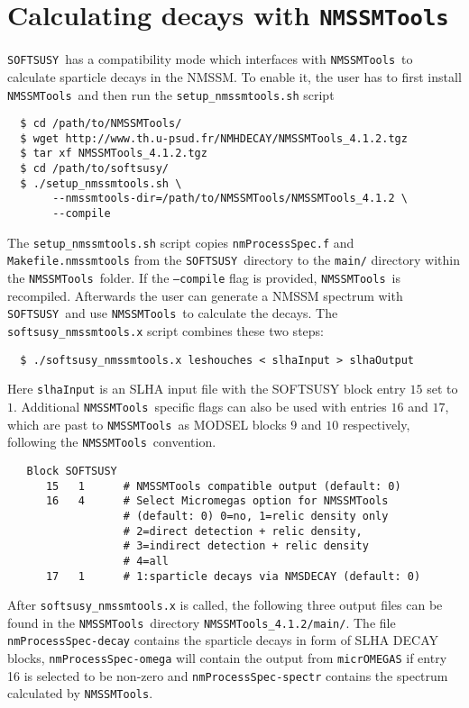 \documentclass[final,3p,times,pdflatex]{elsarticle}
\def\SOFTSUSY{{\tt SOFTSUSY}}
\def\NMSSMTools{{\tt NMSSMTools}}
\def\code#1{\small{\tt #1}\normalsize}
\begin{document}


\section{Calculating decays with \NMSSMTools\label{sec:decays}}

\SOFTSUSY\ has a compatibility mode which interfaces with \NMSSMTools\
to calculate sparticle decays in the NMSSM.  To enable it, the
user has to first install \NMSSMTools\ and then run the
\code{setup\_nmssmtools.sh} script
%
\begin{verbatim}
  $ cd /path/to/NMSSMTools/
  $ wget http://www.th.u-psud.fr/NMHDECAY/NMSSMTools_4.1.2.tgz
  $ tar xf NMSSMTools_4.1.2.tgz
  $ cd /path/to/softsusy/
  $ ./setup_nmssmtools.sh \
       --nmssmtools-dir=/path/to/NMSSMTools/NMSSMTools_4.1.2 \
       --compile
\end{verbatim}
%
The \code{setup\_nmssmtools.sh} script copies \code{nmProcessSpec.f}
and \code{Makefile.nmssmtools} from the \SOFTSUSY\ directory to the
{\tt main/} directory within the \NMSSMTools\ folder.  If the \code{--compile}
flag is provided, \NMSSMTools\ is recompiled.  Afterwards the user can
generate a NMSSM spectrum with \SOFTSUSY\ and use \NMSSMTools\ to
calculate the decays.  The \code{softsusy\_nmssmtools.x} script combines
these two steps:
%
\begin{verbatim}
  $ ./softsusy_nmssmtools.x leshouches < slhaInput > slhaOutput
\end{verbatim}
%
Here \code{slhaInput} is an SLHA input file with the SOFTSUSY block
entry $15$ set to $1$.  Additional \NMSSMTools\ specific flags can also
be used with entries $16$ and $17$, which are past to \NMSSMTools\ as
MODSEL blocks $9$ and $10$ respectively, following the \NMSSMTools\
convention.
%
\begin{verbatim}
   Block SOFTSUSY
      15   1      # NMSSMTools compatible output (default: 0) 
      16   4      # Select Micromegas option for NMSSMTools
                  # (default: 0) 0=no, 1=relic density only
                  # 2=direct detection + relic density, 
                  # 3=indirect detection + relic density
                  # 4=all  
      17   1      # 1:sparticle decays via NMSDECAY (default: 0)
\end{verbatim}
%
After \code{softsusy\_nmssmtools.x} is called, the following three output
files can be found in the \NMSSMTools\ directory
\code{NMSSMTools\_4.1.2/main/}. The file \code{nmProcessSpec-decay}
contains the sparticle decays in form of SLHA DECAY blocks,
\code{nmProcessSpec-omega} will contain the output from \code{micrOMEGAS} if entry 16 is selected to be non-zero and
\code{nmProcessSpec-spectr} contains the spectrum calculated by
\NMSSMTools.
\end{document}
